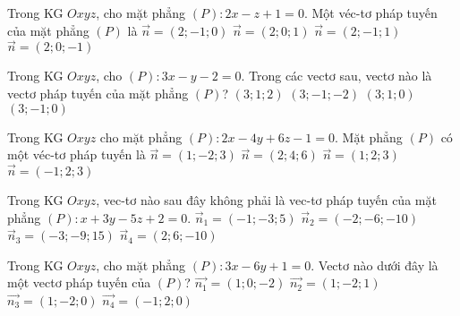 \begin{ex}%
	Trong KG $Oxyz$, cho mặt phẳng $(P)\colon 2x-z+1=0$. Một véc-tơ pháp tuyến của mặt phẳng $ (P) $ là
	\choice
	{$ \overrightarrow{n}=(2;-1;0) $}
	{$ \overrightarrow{n}=(2;0;1) $}
	{$ \overrightarrow{n}=(2;-1;1) $}
	{\True $ \overrightarrow{n}=(2;0;-1) $}
\end{ex}
\begin{ex}%
	Trong KG $Oxyz$,  cho  $(P)\colon 3x-y-2=0$. Trong các vectơ sau, vectơ nào là vectơ pháp tuyến của mặt phẳng $(P)$?
	\choice
	{$(3;1;2)$}
	{$(3;-1;-2)$}
	{$(3;1;0)$}
	{\True $(3;-1;0)$}
\end{ex}
\begin{ex}%
	Trong KG $Oxyz$ cho mặt phẳng $(P)\colon 2x-4y+6z-1=0$. Mặt phẳng $(P)$ có một véc-tơ pháp tuyến là
	\choice
	{\True $\vec{n}=(1;-2;3)$}
	{$\vec{n}=(2;4;6)$}
	{$\vec{n}=(1;2;3)$}
	{$\vec{n}=(-1;2;3)$}
\end{ex}
\begin{ex}%
	Trong KG $Oxyz$, vec-tơ nào sau đây không phải là vec-tơ pháp tuyến của mặt phẳng $(P):x+3y-5z+2=0$.
	\choice
	{$\overrightarrow{n}_1=(-1;-3;5)$}
	{\True $\overrightarrow{n}_2=(-2;-6;-10)$}
	{$\overrightarrow{n}_3=(-3;-9;15)$}
	{$\overrightarrow{n}_4=(2;6;-10)$}
\end{ex}
\begin{ex}%
	Trong KG $Oxyz$, cho mặt phẳng $(P)\colon 3x-6y+1=0$. Vectơ nào dưới đây là một vectơ pháp tuyến của $(P)$?
	\choice
	{ $\vec{n_1}=(1;0;-2)$}
	{$\vec{n_2}=(1;-2;1)$}
	{\True $\vec{n_3}=(1;-2;0)$}
	{$\vec{n_4}=(-1;2;0)$}
\end{ex}
